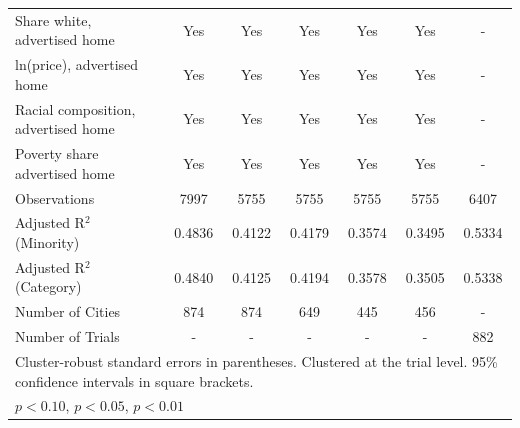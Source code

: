 \begin{table}[htbp]
{\begin{tabular}{l*{6}{c}}
\midrule
Share white, advertised home  & Yes & Yes & Yes & Yes & Yes & - \\
ln(price), advertised home  & Yes & Yes & Yes & Yes & Yes & - \\
Racial composition, advertised home & Yes & Yes & Yes & Yes & Yes & - \\
Poverty share advertised home & Yes & Yes & Yes & Yes & Yes & - \\
Observations & 7997 & 5755 & 5755 & 5755 & 5755 & 6407 \\
Adjusted R$^2$ (Minority) & 0.4836 & 0.4122 & 0.4179 & 0.3574 & 0.3495 & 0.5334 \\
Adjusted R$^2$ (Category) & 0.4840 & 0.4125 & 0.4194 & 0.3578 & 0.3505 & 0.5338 \\
Number of Cities & 874 & 874 & 649 & 445 & 456 & - \\
Number of Trials & - & - & - & - & - & 882 \\
\bottomrule
\multicolumn{7}{l}{\footnotesize Cluster-robust standard errors in parentheses. Clustered at the trial level. 95\% confidence intervals in square brackets.}\\
\multicolumn{7}{l}{\footnotesize \sym{*} \(p<0.10\), \sym{**} \(p<0.05\), \sym{***} \(p<0.01\)}\\
\end{tabular}
}
\end{table}
